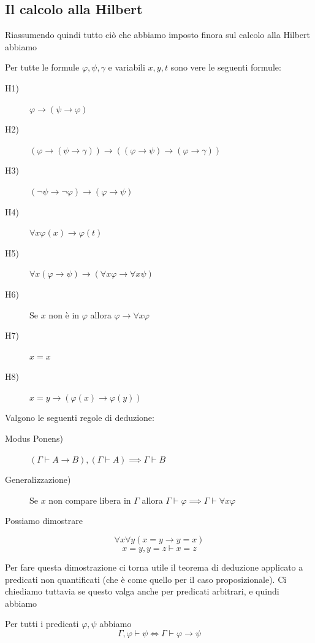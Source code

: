 \documentclass[11pt]{scrartcl}
\begin{document}
	\subsection{Il calcolo alla Hilbert}
	Riassumendo quindi tutto ciò che abbiamo imposto finora sul calcolo alla Hilbert abbiamo
	\begin{definition}
		Per tutte le formule $\varphi,\psi,\gamma$ e variabili $x,y,t$ sono vere le seguenti formule:
		\begin{description}
			\item[H1)] $\varphi \to (\psi \to \varphi)$
			\item[H2)] $(\varphi \to (\psi \to \gamma))\to ((\varphi\to \psi)\to (\varphi \to \gamma))$
			\item[H3)] $(\lnot \psi \to \lnot \varphi)	\to (\varphi \to \psi)$
			\item[H4)] $ \forall x \varphi(x) \to \varphi(t)$
			\item[H5)] $ \forall x (\varphi \to \psi) \to \left(\forall x \varphi \to \forall x \psi\right)$
			\item[H6)] Se $x$ non è in $\varphi$ allora $\varphi \to \forall x\varphi$
			\item[H7)] $x=x$
			\item[H8)] $x=y\to \left(\varphi(x)\to \varphi(y)\right)$
		\end{description}
	\end{definition}
	\begin{definition}
		Valgono le seguenti regole di deduzione:
		\begin{description}
			\item[Modus Ponens)] $(\Gamma \vdash A\to B), (\Gamma\vdash A) \implies \Gamma \vdash B$
			\item[Generalizzazione)] Se $x$ non compare libera in $\Gamma$ allora $\Gamma\vdash \varphi \implies \Gamma \vdash \forall x\varphi$
		\end{description}
	\end{definition}
	Possiamo dimostrare
	\begin{lemma}
		$$\forall x\forall y (x=y \to y=x)$$
		$$x=y,y=z \vdash x=z$$
	\end{lemma}
	Per fare questa dimostrazione ci torna utile il teorema di deduzione applicato a predicati non quantificati (che è come quello per il caso proposizionale). Ci chiediamo tuttavia se questo valga anche per predicati arbitrari, e quindi abbiamo
	\begin{metateorema}[di deduzione]
		Per tutti i predicati $\varphi,\psi$ abbiamo
		$$\Gamma,\varphi\vdash \psi \iff \Gamma \vdash \varphi\to \psi$$
	\end{metateorema}
\end{document}
